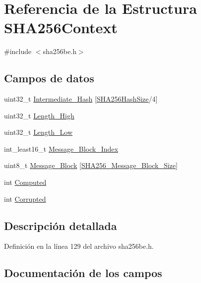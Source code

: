 \hypertarget{struct_s_h_a256_context}{}\section{Referencia de la Estructura S\+H\+A256\+Context}
\label{struct_s_h_a256_context}


{\ttfamily \#include $<$sha256be.\+h$>$}

\subsection*{Campos de datos}
\begin{DoxyCompactItemize}
\item 
uint32\+\_\+t \hyperlink{struct_s_h_a256_context_a5d9aeb28e3a5c2f444066c1c9685ac91}{Intermediate\+\_\+\+Hash} \mbox{[}\hyperlink{sha256be_8h_adf764cbdea00d65edcd07bb9953ad2b7a3a8b66cf5d0bd8cc0e375a86a754ab28}{S\+H\+A256\+Hash\+Size}/4\mbox{]}
\item 
uint32\+\_\+t \hyperlink{struct_s_h_a256_context_a73f82f23d8acae6d67b249511811d654}{Length\+\_\+\+High}
\item 
uint32\+\_\+t \hyperlink{struct_s_h_a256_context_a188eef03938236a9a58c9382166aa002}{Length\+\_\+\+Low}
\item 
int\+\_\+least16\+\_\+t \hyperlink{struct_s_h_a256_context_ad7bf01bcc0244679564a37f2c25ffc8c}{Message\+\_\+\+Block\+\_\+\+Index}
\item 
uint8\+\_\+t \hyperlink{struct_s_h_a256_context_a84b3f788f46b63afe4b879ed78e73051}{Message\+\_\+\+Block} \mbox{[}\hyperlink{sha256be_8h_adf764cbdea00d65edcd07bb9953ad2b7af163926be4ff6a506a77f737295b6884}{S\+H\+A256\+\_\+\+Message\+\_\+\+Block\+\_\+\+Size}\mbox{]}
\item 
int \hyperlink{struct_s_h_a256_context_aeb5a7a168bb512db53299543094702aa}{Computed}
\item 
int \hyperlink{struct_s_h_a256_context_a4bc60740c300c7929a676f997d9484a9}{Corrupted}
\end{DoxyCompactItemize}


\subsection{Descripción detallada}


Definición en la línea 129 del archivo sha256be.\+h.



\subsection{Documentación de los campos}
\hypertarget{struct_s_h_a256_context_aeb5a7a168bb512db53299543094702aa}{}
